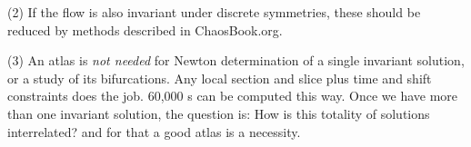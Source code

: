 (2) If the flow is also invariant under discrete symmetries, these should
be reduced by methods described in ChaosBook.org.

(3) An atlas is \emph{not needed} for Newton determination of a single
invariant solution, or a study of its bifurcations. Any local
section and slice plus time and shift constraints does the job. 60,000
\rpo s can be computed this way. Once we have more than one
invariant solution, the question is: How is this totality of solutions
interrelated? and for that a good atlas is a necessity.

